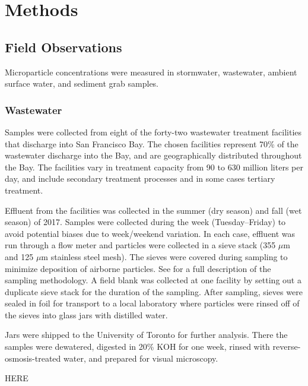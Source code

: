 \documentclass[draft]{jgr/agujournal2019}
\begin{document}

\section{Methods}

\subsection{Field Observations}

Microparticle concentrations were measured in stormwater, wastewater,
ambient surface water, and sediment grab samples.

\subsubsection{Wastewater}

Samples were collected from eight of the forty-two wastewater
treatment facilities that discharge into San Francisco Bay. The chosen
facilities represent 70\% of the wastewater discharge into the Bay,
and are geographically distributed throughout the Bay.
The facilities vary in treatment capacity from 90 to 630 million liters per day,
and include secondary treatment processes and in some cases tertiary
treatment.

Effluent from the facilities was collected in the summer (dry season)
and fall (wet season) of 2017. Samples were collected during the week
(Tuesday--Friday) to avoid potential biases due to week/weekend
variation.  In each case, effluent was run through a flow meter and
particles were collected in a sieve stack (355 $\mu\textrm{m}$ and 125 $\mu\textrm{m}$
stainless steel mesh). The sieves were covered during sampling to
minimize deposition of airborne particles. See
 for a full description of the sampling
methodology.  A field blank was collected at one facility by setting
out a duplicate sieve stack for the duration of the sampling.
After sampling, sieves were sealed in foil for transport to a
local laboratory where particles were rinsed off of the sieves into glass
jars with distilled water.

Jars were shipped to the University of Toronto for further analysis.
There the samples were dewatered, digested in 20\% KOH for one week,
rinsed with reverse-osmosis-treated water, and prepared for visual
microscopy.

HERE
\end{document}
